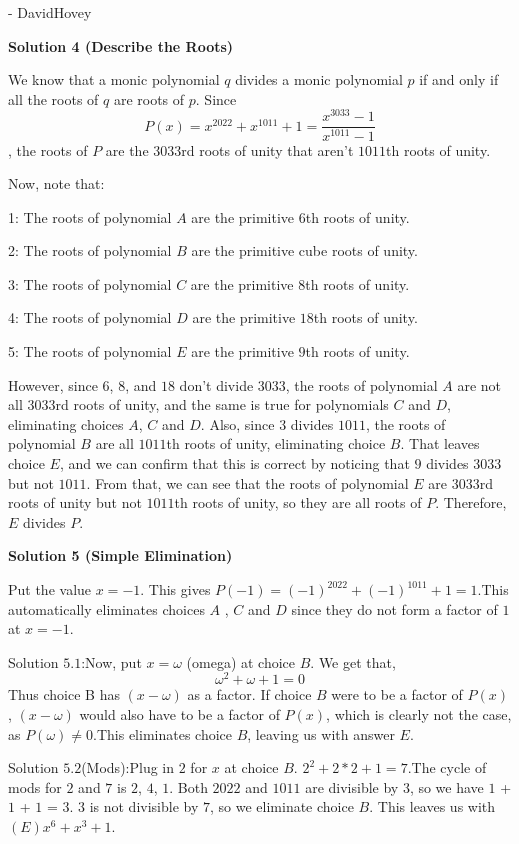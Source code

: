 \begin{enumerate}
 - DavidHovey

 



\textbf{Solution 4 (Describe the Roots)}

We know that a monic polynomial $q$ divides a monic polynomial $p$ if and only if all the roots of $q$ are roots of $p.$ Since 
 \[P(x)=x^{2022}+x^{1011}+1=\frac{x^{3033}-1}{x^{1011}-1}\], the roots of $P$ are the $3033$rd roots of unity that aren't $1011$th roots of unity. 

 Now, note that:

 1: The roots of polynomial $A$ are the primitive $6$th roots of unity.

 2: The roots of polynomial $B$ are the primitive cube roots of unity.

 3: The roots of polynomial $C$ are the primitive $8$th roots of unity.

 4: The roots of polynomial $D$ are the primitive $18$th roots of unity.

 5: The roots of polynomial $E$ are the primitive $9$th roots of unity.

 However, since $6$, $8$, and $18$ don't divide $3033$, the roots of polynomial $A$ are not all $3033$rd roots of unity, and the same is true for polynomials $C$ and $D$, eliminating choices $A$, $C$ and $D.$ Also, since $3$ divides $1011$, the roots of polynomial $B$ are all $1011$th roots of unity, eliminating choice $B.$ That leaves choice $\boxed{E}$, and we can confirm that this is correct by noticing that $9$ divides $3033$ but not $1011.$ From that, we can see that the roots of polynomial $E$ are $3033$rd roots of unity but not $1011$th roots of unity, so they are all roots of $P.$ Therefore, $E$ divides $P.$




\textbf{Solution 5 (Simple Elimination)}

Put the value $x = -1$. This gives $P(-1) = (-1)^{2022} + (-1)^{1011} + 1 = 1$.This automatically eliminates choices $A$ , $C$ and $D$ since they do not form a factor of $1$ at $x = -1$.

 
Solution $5.1$:Now, put $x = \omega$ (omega) at choice $B$. We get that,
 \[\omega^2 + \omega + 1 = 0\]Thus choice B has $(x - \omega)$ as a factor. If choice $B$ were to be a factor of $P(x)$, $(x - \omega)$ would also have to be a factor of $P(x)$, which is clearly not the case, as $P(\omega) \neq 0$.This eliminates choice $B$, leaving us with answer $\boxed{E}$.

 
Solution $5.2$(Mods):Plug in $2$ for $x$ at choice $B$. $2^2+2*2+1=7$.The cycle of mods for $2$ and $7$ is $2$, $4$, $1$. Both $2022$ and $1011$ are divisible by $3$, so we have $1$ + $1$ + $1$ = $3$. $3$ is not divisible by $7$, so we eliminate choice $B$. This leaves us with $\boxed{(E) x^{6}+x^{3}+1}$.


\end{enumerate}
